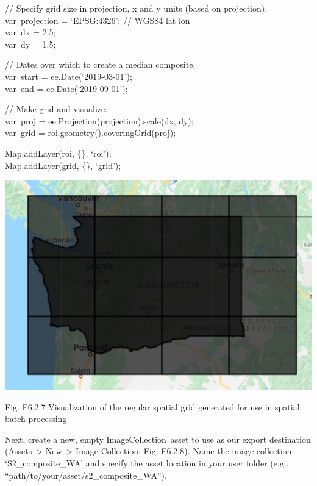 \documentclass[
  letterpaper,
  DIV=11,
  numbers=noendperiod]{scrreprt}
\begin{document}
// Specify grid size in projection, x and y units (based on
projection).\\
var~projection = `EPSG:4326'; // WGS84 lat lon\\
var~dx = 2.5;\\
var~dy = 1.5;

// Dates over which to create a median composite.\\
var~start = ee.Date(`2019-03-01');\\
var~end = ee.Date(`2019-09-01');

// Make grid and visualize.\\
var~proj = ee.Projection(projection).scale(dx, dy);\\
var~grid = roi.geometry().coveringGrid(proj);

Map.addLayer(roi, \{\}, `roi');\\
Map.addLayer(grid, \{\}, `grid');

\includegraphics{./F6/image12.png}

Fig. F6.2.7 Visualization of the regular spatial grid generated for use
in spatial batch processing

Next, create a new, empty ImageCollection~asset to use as our export
destination (Assets~\textgreater{} New~\textgreater{} Image Collection;
Fig. F6.2.8). Name the image collection `S2\_composite\_WA' and specify
the asset location in your user folder (e.g.,
``path/to/your/asset/s2\_composite\_WA'').
\end{document}
